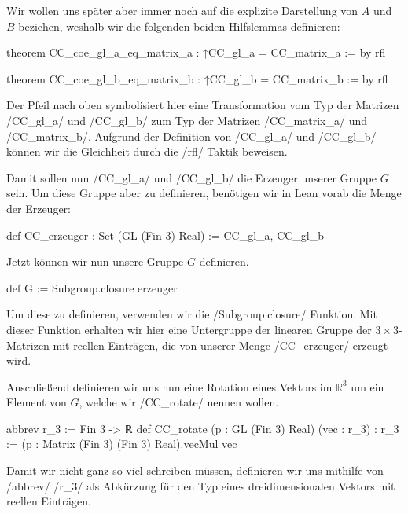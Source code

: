 \documentclass[10pt]{article}
\begin{document}
\noindent Wir wollen uns später aber immer noch auf die explizite Darstellung von $A$ und $B$ beziehen, weshalb wir die folgenden beiden Hilfslemmas definieren:
\begin{leancode}
theorem CC_coe_gl_a_eq_matrix_a : ↑CC_gl_a = CC_matrix_a := by
  rfl

theorem CC_coe_gl_b_eq_matrix_b : ↑CC_gl_b = CC_matrix_b := by
  rfl
\end{leancode}
\noindent Der Pfeil nach oben symbolisiert hier eine Transformation vom Typ der Matrizen \lean/CC_gl_a/ und \lean/CC_gl_b/ zum Typ der Matrizen \lean/CC_matrix_a/ und \lean/CC_matrix_b/. Aufgrund der Definition von \lean/CC_gl_a/ und \lean/CC_gl_b/ können wir die Gleichheit durch die \lean/rfl/ Taktik beweisen.

\noindent Damit sollen nun \lean/CC_gl_a/ und \lean/CC_gl_b/ die Erzeuger unserer Gruppe $G$ sein. Um diese Gruppe aber zu definieren, benötigen wir in Lean vorab die Menge der Erzeuger:
\begin{leancode}
def CC_erzeuger : Set (GL (Fin 3) Real) := {CC_gl_a, CC_gl_b}
\end{leancode}
Jetzt können wir nun unsere Gruppe $G$ definieren.
\begin{leancode}
def G := Subgroup.closure erzeuger
\end{leancode}
\noindent Um diese zu definieren, verwenden wir die \lean/Subgroup.closure/ Funktion. Mit dieser Funktion erhalten wir hier eine Untergruppe der linearen Gruppe der $3\times 3$-Matrizen mit reellen Einträgen, die von unserer Menge \lean/CC_erzeuger/ erzeugt wird. 

\noindent Anschließend definieren wir uns nun eine Rotation eines Vektors im $\mathbb{R}^3$ um ein Element von $G$, welche wir \lean/CC_rotate/ nennen wollen.



\begin{leancode}
abbrev r_3 := Fin 3 -> ℝ
def CC_rotate (p : GL (Fin 3) Real) (vec : r_3) : r_3 :=
  (p : Matrix (Fin 3) (Fin 3) Real).vecMul vec
\end{leancode}
\noindent Damit wir nicht ganz so viel schreiben müssen, definieren wir uns mithilfe von \lean/abbrev/ \lean/r_3/ als Abkürzung für den Typ eines dreidimensionalen Vektors mit reellen Einträgen.\par
\end{document}
